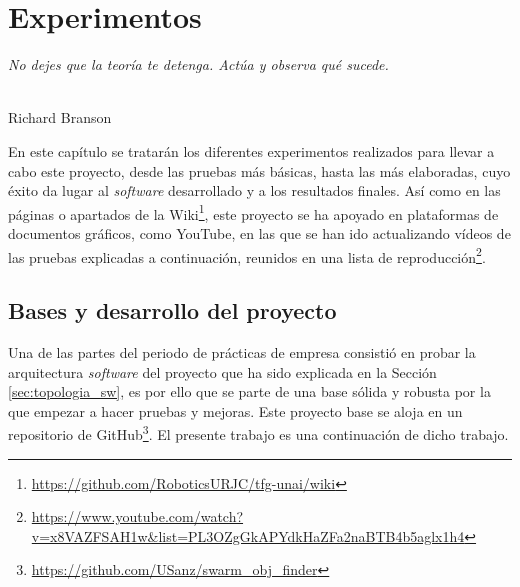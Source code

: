 \chapter{Experimentos}
\label{cap:capitulo5}

\begin{flushright}
\begin{minipage}[]{10cm}
\emph{No dejes que la teoría te detenga. Actúa y observa qué sucede.}\\
\end{minipage}\\

Richard Branson\\
\end{flushright}

\vspace{1cm}

En este capítulo se tratarán los diferentes experimentos realizados para llevar
a cabo este proyecto, desde las pruebas más básicas, hasta las más elaboradas,
cuyo éxito da lugar al \textit{software} desarrollado y a los resultados
finales.
Así como en las páginas o apartados de la Wiki\footnote{
\href{https://github.com/RoboticsURJC/tfg-unai/wiki}{https://github.com/RoboticsURJC/tfg-unai/wiki}},
este proyecto se ha apoyado en plataformas de documentos gráficos, como YouTube,
en las que se han ido actualizando vídeos de las pruebas explicadas a
continuación, reunidos en una lista de reproducción\footnote{
\href{https://www.youtube.com/watch?v=x8VAZFSAH1w\&list=PL3OZgGkAPYdkHaZFa2naBTB4b5aglx1h4}{https://www.youtube.com/watch?v=x8VAZFSAH1w\&list=PL3OZgGkAPYdkHaZFa2naBTB4b5aglx1h4}}.



\section{Bases y desarrollo del proyecto}
\label{sec:bases}

Una de las partes del periodo de prácticas de empresa consistió en probar la
arquitectura \textit{software} del proyecto que ha sido explicada en la Sección
\ref{sec:topologia_sw}, es por ello que se parte de una base sólida y robusta
por la que empezar a hacer pruebas y mejoras.
Este proyecto base se aloja en un repositorio de GitHub\footnote{
\href{https://github.com/USanz/swarm\_obj\_finder}{https://github.com/USanz/swarm\_obj\_finder}}.
El presente trabajo es una continuación de dicho trabajo.
\\

